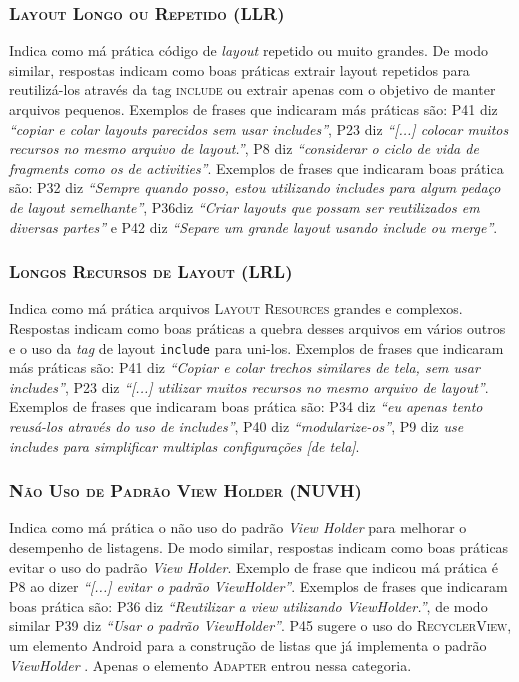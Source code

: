 \subsubsection{\textsc{Layout Longo ou Repetido (LLR)}}
Indica como má prática código de \textit{layout} repetido ou muito grandes. De modo similar, respostas indicam como boas práticas extrair layout repetidos para reutilizá-los através da tag \textsc{include} ou extrair apenas com o objetivo de manter arquivos pequenos. Exemplos de frases que indicaram más práticas são: P41 diz \textit{``copiar e colar layouts parecidos sem usar includes''}, P23 diz \textit{``[...] colocar muitos recursos no mesmo arquivo de layout.''}, P8 diz \textit{``considerar o ciclo de vida de fragments como os de activities''}. Exemplos de frases que indicaram boas prática são: P32 diz \textit{``Sempre quando posso, estou utilizando includes para algum pedaço de layout semelhante''}, P36diz \textit{``Criar layouts que possam ser reutilizados em diversas partes''} e P42 diz \textit{``Separe um grande layout usando include ou merge''}. 


\subsubsection{\textsc{Longos Recursos de Layout (LRL)}}
Indica como má prática arquivos \textsc{Layout Resources} grandes e complexos. Respostas indicam como boas práticas a quebra desses arquivos em vários outros e o uso da \textit{tag} de layout \texttt{include} para uni-los. Exemplos de frases que indicaram más práticas são: P41 diz \textit{``Copiar e colar trechos similares de tela, sem usar includes''}, P23 diz \textit{``[...] utilizar muitos recursos no mesmo arquivo de layout''}. Exemplos de frases que indicaram boas prática são: P34 diz \textit{``eu apenas tento reusá-los através do uso de includes''}, P40 diz \textit{``modularize-os''}, P9 diz \textit{use includes para simplificar multiplas configurações [de tela]}. 

\subsubsection{\textsc{Não Uso de Padrão View Holder (NUVH)}}
Indica como má prática o não uso do padrão \textit{View Holder} \cite{AluraViewHolder} para melhorar o desempenho de listagens. De modo similar, respostas indicam como boas práticas evitar o uso do padrão \textit{View Holder}. Exemplo de frase que indicou má prática é P8 ao dizer \textit{``[...] evitar o padrão ViewHolder''}. Exemplos de frases que indicaram boas prática são: P36 diz \textit{``Reutilizar a view utilizando ViewHolder.''}, de modo similar P39 diz \textit{``Usar o padrão ViewHolder''}. P45 sugere o uso do \textsc{RecyclerView}, um elemento Android para a construção de listas que já implementa o padrão \textit{ViewHolder} \cite{AluraViewHolder}. Apenas o elemento \textsc{Adapter} entrou nessa categoria. 

